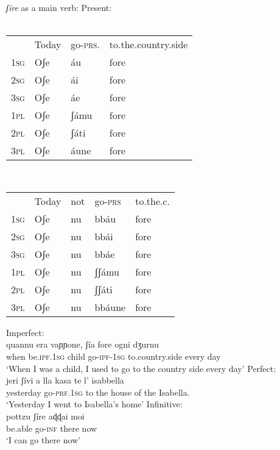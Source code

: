 \documentclass[output=paper]{langscibook}
\begin{document}
\ea \label{ac24}\textit{ʃire} as a main verb:
    \ea \label{ac24a}Present:\\
       \ea\label{ac24ai}~\\
            \begin{tabular}[t]{llll}
                & Today & go-\textsc{prs}. & to.the.country.side\\
            \textsc{1sg} & Oʃe   & áu      & fore\\
            \textsc{2sg} & Oʃe   & ái      & fore\\
            \textsc{3sg} & Oʃe   & áe      & fore\\
            \textsc{1pl} & Oʃe   & ʃámu    & fore\\
            \textsc{2pl} & Oʃe   & ʃáti    & fore\\
            \textsc{3pl} & Oʃe   & áune    & fore\\
            \end{tabular}
        \ex\label{ac24aii}~\\
        \begin{tabular}[t]{lllll}
         & Today & not     & go-\textsc{prs}              & to.the.c. \\
        \textsc{1sg} & Oʃe   & nu      & bbáu                & fore      \\
        \textsc{2sg} & Oʃe   & nu      & bbái                & fore      \\
        \textsc{3sg} & Oʃe   & nu      & bbáe                & fore      \\
        \textsc{1pl} & Oʃe   & nu      & ʃʃámu               & fore      \\
        \textsc{2pl} & Oʃe   & nu      & ʃʃáti               & fore      \\
        \textsc{3pl} & Oʃe   & nu      & bbáune              & fore
        \end{tabular}
        \z
    \ex \label{ac24b}Imperfect:\\
    \gll      quannu era    vaɲɲone, ʃía      fore    ogni dʒurnu\\
     when be.\textsc{ipf}.\textsc{1sg} child  go-\textsc{ipf}-\textsc{1sg} to.country.side every day\\
     \glt ‘When I was a child, I used to go to the country side every day’
    \ex  \label{ac24c}Perfect: \\
    \gll jeri      ʃívi      a lla  kasa   te l’ isabbella\\
     yesterday  go-\textsc{prf}.\textsc{1sg} to the house of the Isabella.\\
    \glt ‘Yesterday I went to Isabella’s home’
    \ex \label{ac24d}Infinitive: \\
     \gll pottzu  ʃíre    aɖɖai  moi\\
     be.able go-\textsc{inf}  there now\\
     \glt ‘I can go there now’
    \z
\z
\end{document}

